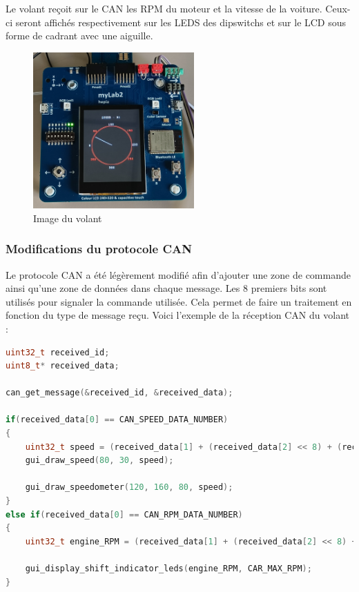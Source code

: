 \documentclass[french, 11pt]{article}
\begin{document}
		Le volant reçoit sur le CAN les RPM du moteur et la vitesse de la voiture. Ceux-ci seront affichés respectivement sur les LEDS des dipswitchs et sur le LCD sous forme de cadrant avec une aiguille. 

		\begin{figure}[H]
			\centering
			\includegraphics[width=0.55\textwidth]{Images/mylab_wheel.jpg}
			\caption{Image du volant}
		\end{figure}

		\subsubsection{Modifications du protocole CAN}
		\label{CAN}

		Le protocole CAN a été légèrement modifié afin d'ajouter une zone de commande ainsi qu'une zone de données dans chaque message. Les 8 premiers bits sont utilisés pour signaler la commande utilisée. Cela permet de faire un traitement en fonction du type de message reçu. Voici l'exemple de la réception CAN du volant : 

\begin{lstlisting}[language=c, caption=Exemple de réception CAN en fonction du champ de commande]
uint32_t received_id;
uint8_t* received_data;

can_get_message(&received_id, &received_data);

if(received_data[0] == CAN_SPEED_DATA_NUMBER)
{
	uint32_t speed = (received_data[1] + (received_data[2] << 8) + (received_data[3] << 16) + (received_data[4] << 24));
	gui_draw_speed(80, 30, speed);

	gui_draw_speedometer(120, 160, 80, speed);
}
else if(received_data[0] == CAN_RPM_DATA_NUMBER)
{
	uint32_t engine_RPM = (received_data[1] + (received_data[2] << 8) + (received_data[3] << 16) + (received_data[4] << 24));

	gui_display_shift_indicator_leds(engine_RPM, CAR_MAX_RPM);
}
\end{lstlisting}
\end{document}
